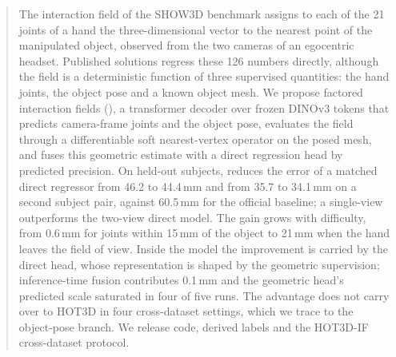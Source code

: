 \begin{abstract}
The interaction field of the SHOW3D benchmark assigns to each of the 21 joints of a hand the three-dimensional vector to the nearest point of the manipulated object, observed from the two cameras of an egocentric headset. Published solutions regress these 126 numbers directly, although the field is a deterministic function of three supervised quantities: the hand joints, the object pose and a known object mesh. We propose factored interaction fields (\method{}), a transformer decoder over frozen DINOv3 tokens that predicts camera-frame joints and the object pose, evaluates the field through a differentiable soft nearest-vertex operator on the posed mesh, and fuses this geometric estimate with a direct regression head by predicted precision. On held-out subjects, \method{} reduces the error of a matched direct regressor from 46.2 to 44.4\,mm and from 35.7 to 34.1\,mm on a second subject pair, against 60.5\,mm for the official baseline; a single-view \method{} outperforms the two-view direct model. The gain grows with difficulty, from 0.6\,mm for joints within 15\,mm of the object to 21\,mm when the hand leaves the field of view. Inside the model the improvement is carried by the direct head, whose representation is shaped by the geometric supervision; inference-time fusion contributes 0.1\,mm and the geometric head's predicted scale saturated in four of five runs. The advantage does not carry over to HOT3D in four cross-dataset settings, which we trace to the object-pose branch. We release code, derived labels and the HOT3D-IF cross-dataset protocol.
\end{abstract}
